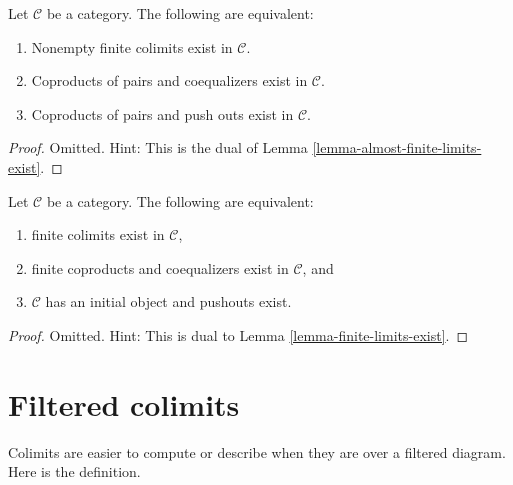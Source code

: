 \begin{lemma}
\label{lemma-almost-finite-colimits-exist}
Let $\mathcal{C}$ be a category.
The following are equivalent:
\begin{enumerate}
\item Nonempty finite colimits exist in $\mathcal{C}$.
\item Coproducts of pairs and coequalizers exist in $\mathcal{C}$.
\item Coproducts of pairs and push outs exist in $\mathcal{C}$.
\end{enumerate}
\end{lemma}

\begin{proof}
Omitted. Hint: This is the dual of
Lemma \ref{lemma-almost-finite-limits-exist}.
\end{proof}

\begin{lemma}
\label{lemma-colimits-exist}
Let $\mathcal{C}$ be a category.
The following are equivalent:
\begin{enumerate}
\item finite colimits exist in $\mathcal{C}$,
\item finite coproducts and coequalizers exist in $\mathcal{C}$, and
\item $\mathcal{C}$ has an initial object and pushouts exist.
\end{enumerate}
\end{lemma}

\begin{proof}
Omitted. Hint: This is dual to Lemma \ref{lemma-finite-limits-exist}.
\end{proof}





\section{Filtered colimits}
\label{section-directed-colimits}

\noindent
Colimits are easier to compute or describe when they
are over a filtered diagram. Here is the definition.

